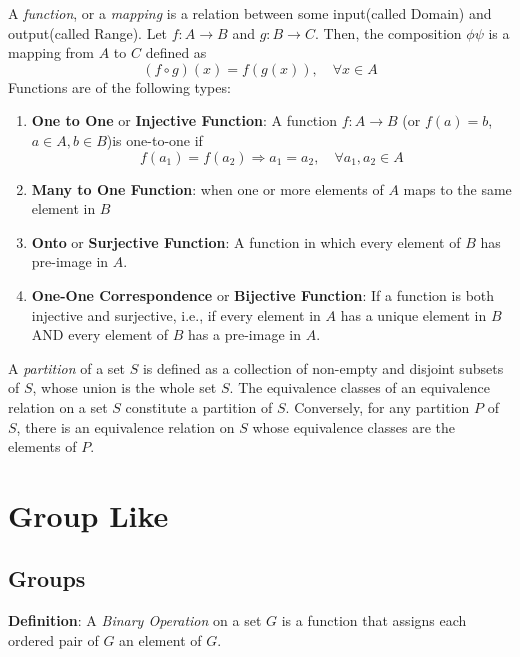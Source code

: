 \documentclass[a4paper, 12pt]{article}
\numberwithin{equation}{section}
\begin{document}
A \textit{function}, or a \textit{mapping} is a relation between some input(called Domain) and output(called Range). 
Let $f: A \to B$ and $g: B \to C$. Then, the composition $\phi \psi$  is a mapping from $A$ to $C$ defined as 
\begin{equation}
(f \circ g)(x) = f(g(x)), \quad \forall x \in A
\end{equation}
Functions are of the following types:
\begin{enumerate}
 \item \textbf{One to One} or \textbf{Injective Function}: A function $f: A \to B$ (or $f(a) = b$, $a \in A, b \in B$)is one-to-one if
 \begin{equation}
 f(a_1) = f(a_2) \Rightarrow a_1 = a_2, \quad \forall a_1, a_2 \in A
 \end{equation}
 
 \item \textbf{Many to One Function}: when one or more elements of $A$ maps to the same element in $B$
 
 \item \textbf{Onto} or \textbf{Surjective Function}: A function in which every element of $B$ has pre-image in $A$.
 
 \item \textbf{One-One Correspondence} or \textbf{Bijective Function}: If a function is both injective and surjective, i.e., if every element in $A$ has a unique element in $B$ AND every element of $B$ has a pre-image in $A$.
 
\end{enumerate}

A \textit{partition} of a set $S$ is defined as a collection of non-empty and disjoint subsets of $S$, whose union is the whole set $S$. The equivalence classes of an equivalence relation on a set $S$ constitute a partition of $S$. Conversely, for any partition $P$ of $S$, there is an equivalence relation on $S$ whose equivalence classes are the elements of $P$.


\newpage
\section{Group Like}
\subsection{Groups}

\textbf{Definition}: A \textit{Binary Operation} on a set $G$ is a function that assigns each ordered pair of $G$ an element of $G$.
\end{document}
